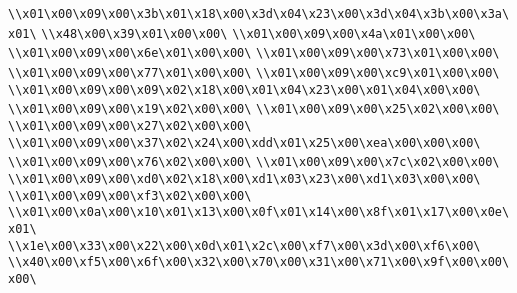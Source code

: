 \verb|\\x01\x00\x09\x00\x3b\x01\x18\x00\x3d\x04\x23\x00\x3d\x04\x3b\x00\x3a\x01\|\newline
\verb|\\x48\x00\x39\x01\x00\x00\|\newline
\verb|\\x01\x00\x09\x00\x4a\x01\x00\x00\|\newline
\verb|\\x01\x00\x09\x00\x6e\x01\x00\x00\|\newline
\verb|\\x01\x00\x09\x00\x73\x01\x00\x00\|\newline
\verb|\\x01\x00\x09\x00\x77\x01\x00\x00\|\newline
\verb|\\x01\x00\x09\x00\xc9\x01\x00\x00\|\newline
\verb|\\x01\x00\x09\x00\x09\x02\x18\x00\x01\x04\x23\x00\x01\x04\x00\x00\|\newline
\verb|\\x01\x00\x09\x00\x19\x02\x00\x00\|\newline
\verb|\\x01\x00\x09\x00\x25\x02\x00\x00\|\newline
\verb|\\x01\x00\x09\x00\x27\x02\x00\x00\|\newline
\verb|\\x01\x00\x09\x00\x37\x02\x24\x00\xdd\x01\x25\x00\xea\x00\x00\x00\|\newline
\verb|\\x01\x00\x09\x00\x76\x02\x00\x00\|\newline
\verb|\\x01\x00\x09\x00\x7c\x02\x00\x00\|\newline
\verb|\\x01\x00\x09\x00\xd0\x02\x18\x00\xd1\x03\x23\x00\xd1\x03\x00\x00\|\newline
\verb|\\x01\x00\x09\x00\xf3\x02\x00\x00\|\newline
\verb|\\x01\x00\x0a\x00\x10\x01\x13\x00\x0f\x01\x14\x00\x8f\x01\x17\x00\x0e\x01\|\newline
\verb|\\x1e\x00\x33\x00\x22\x00\x0d\x01\x2c\x00\xf7\x00\x3d\x00\xf6\x00\|\newline
\verb|\\x40\x00\xf5\x00\x6f\x00\x32\x00\x70\x00\x31\x00\x71\x00\x9f\x00\x00\x00\|\newline
